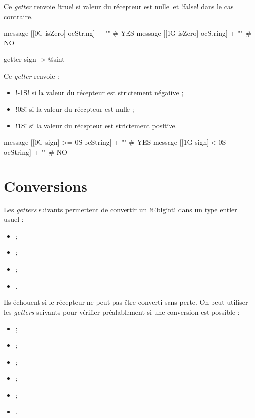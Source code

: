 Ce \emph{getter} renvoie \ggst!true! si valeur du récepteur est nulle, et \ggst!false! dans le cas contraire.

\begin{galgas3}
message [[0G isZero] ocString] + "\n" # YES
message [[1G isZero] ocString] + "\n" # NO
\end{galgas3}




\begin{galgas3box}
getter sign -> @sint
\end{galgas3box}

Ce \emph{getter} renvoie :
\begin{itemize}
\item \ggst!-1S! si la valeur du récepteur est strictement négative ;
\item \ggst!0S! si la valeur du récepteur est nulle ;
\item \ggst!1S! si la valeur du récepteur est strictement positive.
\end{itemize}

\begin{galgas3}
message [[0G sign] >= 0S ocString] + "\n" # YES
message [[1G sign] < 0S ocString] + "\n" # NO
\end{galgas3}











\section{Conversions}


Les \emph{getters} suivants permettent de convertir un \ggst!@bigint! dans un type entier usuel :
\begin{itemize}
  \item {} ;
  \item {} ;
  \item {} ;
  \item {}.
\end{itemize}

Ils échouent si le récepteur ne peut pas être converti sans perte. On peut utiliser les \emph{getters} suivants pour vérifier préalablement si une conversion est possible :
\begin{itemize}
  \item {} ;
  \item {} ;
  \item {} ;
  \item {} ;
  \item {} ;
  \item {}.
\end{itemize}

